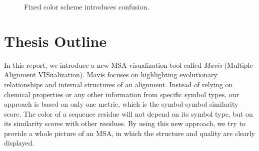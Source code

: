 \begin{figure}[hbt]
\centering
{}
\hspace{5mm}
\caption[Fixed Color Scheme Introduces Confusion]{Fixed color scheme introduces confusion.}\label{fig:intro1}
\end{figure}

\section{Thesis Outline}

In this report, we introduce a new MSA visualization tool called \emph{Mavis} (Multiple Alignment VISualization). Mavis focuses on highlighting evolutionary relationships and internal structures of an alignment. Instead of relying on chemical properties or any other information from specific symbol types, our approach is based on only one metric, which is the symbol-symbol similarity score. The color of a sequence residue will not depend on its symbol type, but on its similarity scores with other residues. By using this new approach, we try to provide a whole picture of an MSA, in which the structure and quality are clearly displayed.

